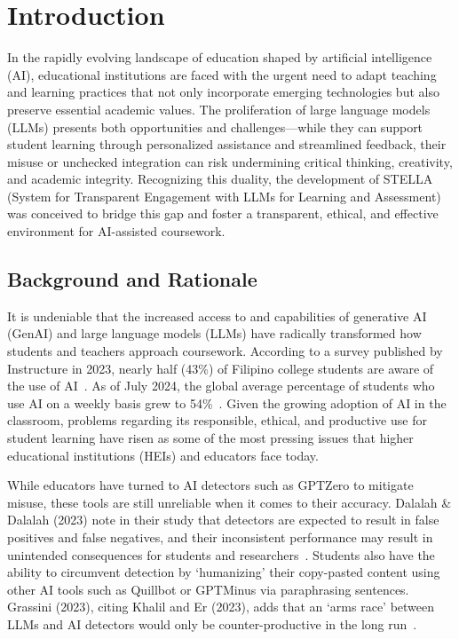 \documentclass[sigconf,natbib=true]{acmart}
\begin{document}

\maketitle

\section{Introduction}
In the rapidly evolving landscape of education shaped by artificial intelligence (AI), educational institutions are faced with the urgent need to adapt teaching and learning practices that not only incorporate emerging technologies but also preserve essential academic values. The proliferation of large language models (LLMs) presents both opportunities and challenges—while they can support student learning through personalized assistance and streamlined feedback, their misuse or unchecked integration can risk undermining critical thinking, creativity, and academic integrity. Recognizing this duality, the development of STELLA (System for Transparent Engagement with LLMs for Learning and Assessment) was conceived to bridge this gap and foster a transparent, ethical, and effective environment for AI-assisted coursework.

\subsection{Background and Rationale}
It is undeniable that the increased access to and capabilities of generative AI (GenAI) and large language models (LLMs) have radically transformed how students and teachers approach coursework. According to a survey published by Instructure in 2023, nearly half (43\%) of Filipino college students are aware of the use of AI~\cite{instructure2023StateStudents2023}. As of July 2024, the global average percentage of students who use AI on a weekly basis grew to 54\%~\cite{digitaleducationcouncilWhatStudentsWant2024}. Given the growing adoption of AI in the classroom, problems regarding its responsible, ethical, and productive use for student learning have risen as some of the most pressing issues that higher educational institutions (HEIs) and educators face today.

While educators have turned to AI detectors such as GPTZero to mitigate misuse, these tools are still unreliable when it comes to their accuracy. Dalalah \& Dalalah (2023) note in their study that detectors are expected to result in false positives and false negatives, and their inconsistent performance may result in unintended consequences for students and researchers~\cite{dalalahFalsePositivesFalse2023a}. Students also have the ability to circumvent detection by `humanizing' their copy-pasted content using other AI tools such as Quillbot or GPTMinus via paraphrasing sentences. Grassini (2023), citing Khalil and Er (2023), adds that an `arms race' between LLMs and AI detectors would only be counter-productive in the long run~\cite{grassiniShapingFutureEducation2023}.
\end{document}
